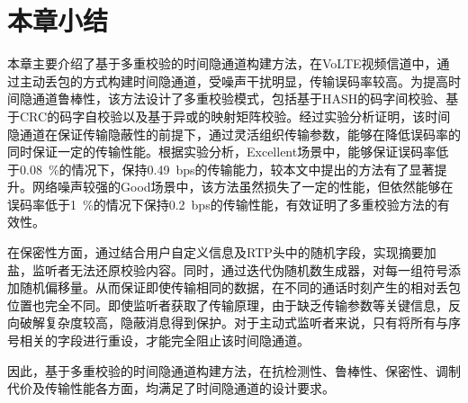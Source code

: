 \section{本章小结}
\label{chap:hash:summary}

本章主要介绍了基于多重校验的时间隐通道构建方法，在VoLTE视频信道中，通过主动丢包的方式构建时间隐通道，受噪声干扰明显，传输误码率较高。为提高时间隐通道鲁棒性，该方法设计了多重校验模式，包括基于HASH的码字间校验、基于CRC的码字自校验以及基于异或的映射矩阵校验。经过实验分析证明，该时间隐通道在保证传输隐蔽性的前提下，通过灵活组织传输参数，能够在降低误码率的同时保证一定的传输性能。根据实验分析，Excellent场景中，能够保证误码率低于{0.08\ \%}的情况下，保持{0.49\ bps}的传输能力，较本文中提出的方法有了显著提升。网络噪声较强的Good场景中，该方法虽然损失了一定的性能，但依然能够在误码率低于{1\ \%}的情况下保持{0.2\ bps}的传输性能，有效证明了多重校验方法的有效性。

在保密性方面，通过结合用户自定义信息及RTP头中的随机字段，实现摘要加盐，监听者无法还原校验内容。同时，通过迭代伪随机数生成器，对每一组符号添加随机偏移量。从而保证即使传输相同的数据，在不同的通话时刻产生的相对丢包位置也完全不同。即使监听者获取了传输原理，由于缺乏传输参数等关键信息，反向破解复杂度较高，隐蔽消息得到保护。对于主动式监听者来说，只有将所有与序号相关的字段进行重设，才能完全阻止该时间隐通道。

因此，基于多重校验的时间隐通道构建方法，在抗检测性、鲁棒性、保密性、调制代价及传输性能各方面，均满足了时间隐通道的设计要求。